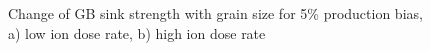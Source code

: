 \documentclass[a4paper]{article}
\begin{document}
      \begin{figure}[h!]  %
        \centering
        \qquad
        \caption{Change of GB sink strength with grain size for 5\% production bias, a) low ion dose rate, b) high ion dose rate}
        \label{figure:sink_strengths_ion_5_1e-6}
      \end{figure}
\end{document}
